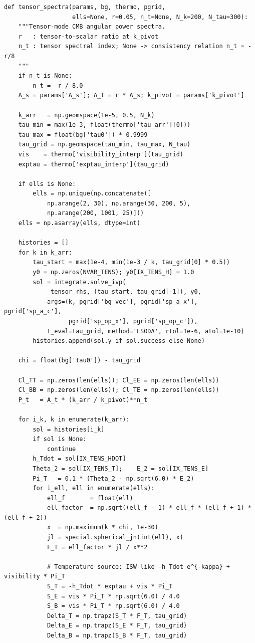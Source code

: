 \begin{codebox}
\begin{lstlisting}[style=python]
def tensor_spectra(params, bg, thermo, pgrid,
                   ells=None, r=0.05, n_t=None, N_k=200, N_tau=300):
    """Tensor-mode CMB angular power spectra.
    r   : tensor-to-scalar ratio at k_pivot
    n_t : tensor spectral index; None -> consistency relation n_t = -r/8
    """
    if n_t is None:
        n_t = -r / 8.0
    A_s = params['A_s']; A_t = r * A_s; k_pivot = params['k_pivot']

    k_arr   = np.geomspace(1e-5, 0.5, N_k)
    tau_min = max(1e-3, float(thermo['tau_arr'][0]))
    tau_max = float(bg['tau0']) * 0.9999
    tau_grid = np.geomspace(tau_min, tau_max, N_tau)
    vis    = thermo['visibility_interp'](tau_grid)
    exptau = thermo['exptau_interp'](tau_grid)

    if ells is None:
        ells = np.unique(np.concatenate([
            np.arange(2, 30), np.arange(30, 200, 5),
            np.arange(200, 1001, 25)]))
    ells = np.asarray(ells, dtype=int)

    histories = []
    for k in k_arr:
        tau_start = max(1e-4, min(1e-3 / k, tau_grid[0] * 0.5))
        y0 = np.zeros(NVAR_TENS); y0[IX_TENS_H] = 1.0
        sol = integrate.solve_ivp(
            _tensor_rhs, (tau_start, tau_grid[-1]), y0,
            args=(k, pgrid['bg_vec'], pgrid['sp_a_x'], pgrid['sp_a_c'],
                  pgrid['sp_op_x'], pgrid['sp_op_c']),
            t_eval=tau_grid, method='LSODA', rtol=1e-6, atol=1e-10)
        histories.append(sol.y if sol.success else None)

    chi = float(bg['tau0']) - tau_grid

    Cl_TT = np.zeros(len(ells)); Cl_EE = np.zeros(len(ells))
    Cl_BB = np.zeros(len(ells)); Cl_TE = np.zeros(len(ells))
    P_t   = A_t * (k_arr / k_pivot)**n_t

    for i_k, k in enumerate(k_arr):
        sol = histories[i_k]
        if sol is None:
            continue
        h_Tdot = sol[IX_TENS_HDOT]
        Theta_2 = sol[IX_TENS_T];    E_2 = sol[IX_TENS_E]
        Pi_T   = 0.1 * (Theta_2 - np.sqrt(6.0) * E_2)
        for i_ell, ell in enumerate(ells):
            ell_f       = float(ell)
            ell_factor  = np.sqrt((ell_f - 1) * ell_f * (ell_f + 1) * (ell_f + 2))
            x  = np.maximum(k * chi, 1e-30)
            jl = special.spherical_jn(int(ell), x)
            F_T = ell_factor * jl / x**2

            # Temperature source: ISW-like -h_Tdot e^{-kappa} + visibility * Pi_T
            S_T = -h_Tdot * exptau + vis * Pi_T
            S_E = vis * Pi_T * np.sqrt(6.0) / 4.0
            S_B = vis * Pi_T * np.sqrt(6.0) / 4.0
            Delta_T = np.trapz(S_T * F_T, tau_grid)
            Delta_E = np.trapz(S_E * F_T, tau_grid)
            Delta_B = np.trapz(S_B * F_T, tau_grid)


\end{lstlisting}
\end{codebox}
